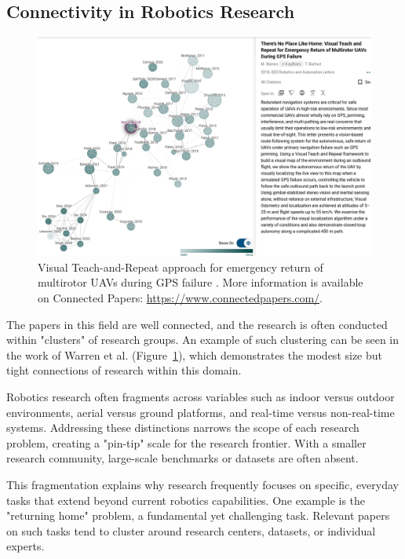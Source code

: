 \documentclass[runningheads]{llncs}
\begin{document}
\subsection{Connectivity in Robotics Research}
\begin{figure}[ht]
  \centering
  \includegraphics[width=\linewidth]{img/There_is_no_place_like_home_research_tree.png}
  \caption{Visual Teach-and-Repeat approach for emergency return of multirotor UAVs during GPS failure \cite{warren-ral19-no-place-like-Home}. More information is available on Connected Papers: \protect\url{https://www.connectedpapers.com/}.}
  \label{fig:no_place_like_home}
\end{figure}

The papers in this field are well connected, and the research is often conducted within "clusters" of research groups. An example of such clustering can be seen in the work of Warren et al. (Figure~\ref{fig:no_place_like_home}), which demonstrates the modest size but tight connections of research within this domain.

Robotics research often fragments across variables such as indoor versus outdoor environments, aerial versus ground platforms, and real-time versus non-real-time systems. Addressing these distinctions narrows the scope of each research problem, creating a "pin-tip" scale for the research frontier. With a smaller research community, large-scale benchmarks or datasets are often absent.

This fragmentation explains why research frequently focuses on specific, everyday tasks that extend beyond current robotics capabilities. One example is the "returning home" problem, a fundamental yet challenging task. Relevant papers on such tasks tend to cluster around research centers, datasets, or individual experts.
\end{document}
